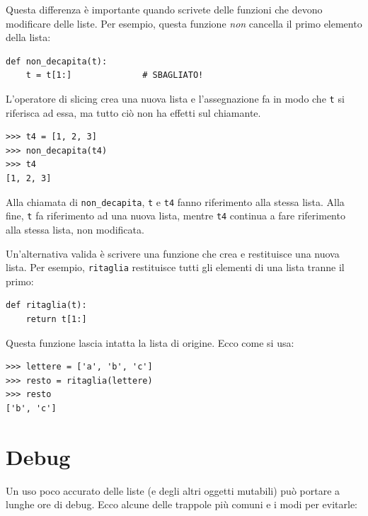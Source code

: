 \documentclass[10pt]{book}
\begin{document}
Questa differenza è importante quando scrivete delle funzioni che devono modificare delle liste. Per esempio, questa funzione
{\em non} cancella il primo elemento della lista:
%
\begin{verbatim}
def non_decapita(t):
    t = t[1:]              # SBAGLIATO!
\end{verbatim}
%
L'operatore di slicing crea una nuova lista e l'assegnazione fa in modo che {\tt t} si riferisca ad essa, ma tutto ciò non ha effetti sul chiamante.
%
\begin{verbatim}
>>> t4 = [1, 2, 3]
>>> non_decapita(t4)
>>> t4
[1, 2, 3]
\end{verbatim}
%
Alla chiamata di \verb"non_decapita", {\tt t} e {\tt t4} fanno riferimento
alla stessa lista.  Alla fine, {\tt t} fa riferimento ad una nuova lista,
mentre {\tt t4} continua a fare riferimento alla stessa lista, non modificata.

Un'alternativa valida è scrivere una funzione che crea e restituisce una nuova lista. Per esempio, {\tt ritaglia} restituisce tutti gli elementi di una lista tranne il primo:

\begin{verbatim}
def ritaglia(t):
    return t[1:]
\end{verbatim}
%
Questa funzione lascia intatta la lista di origine. Ecco come si usa:

\begin{verbatim}
>>> lettere = ['a', 'b', 'c']
>>> resto = ritaglia(lettere)
>>> resto
['b', 'c']
\end{verbatim}



\section{Debug}

Un uso poco accurato delle liste (e degli altri oggetti mutabili) può portare a lunghe ore di debug. Ecco alcune delle trappole più comuni e i modi per evitarle:
\end{document}

